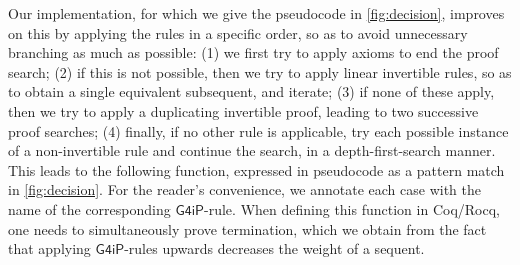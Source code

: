 \documentclass[english,review]{jflart}
\newcommand{\Coq}{{Coq/Rocq}}
\theoremstyle{definition}
\theoremstyle{plain}
\newcommand{\Gfourip}{\mathsf{G4iP}}
\begin{document}
Our implementation, for which we give the pseudocode in \cref{fig:decision}, improves on this by applying the rules in a specific order, so as to avoid unnecessary branching as much as possible: (1) we first try to apply axioms to end the proof search; (2) if this is not possible, then we try to apply linear invertible rules, so as to obtain a single equivalent subsequent, and iterate; (3) if none of these apply, then we try to apply a duplicating invertible proof, leading to two successive proof searches; (4) finally, if no other rule is applicable, try each possible instance of a non-invertible rule and continue the search, in a depth-first-search manner. This leads to the following function, expressed in pseudocode as a pattern match in \cref{fig:decision}. For the reader's convenience, we annotate each case with the name of the corresponding $\Gfourip$-rule. When defining this function in {\Coq}, one needs to simultaneously prove termination, which we obtain from the fact that applying $\Gfourip$-rules upwards decreases the weight of a sequent. 
\end{document}
